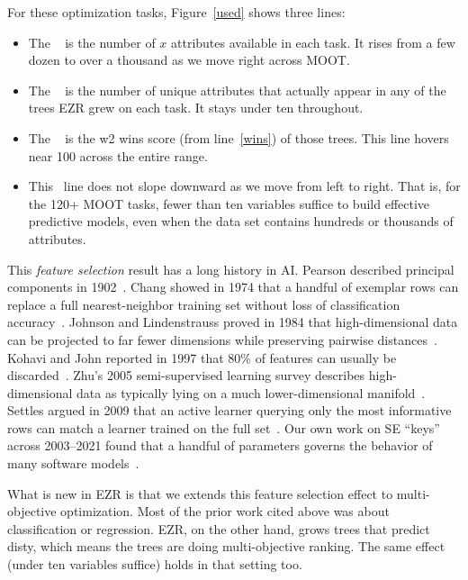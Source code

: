 \documentclass[AMA,STIX2COL]{WileyNJDv5}
\newcommand{\IT}{{\sffamily EZR}}
\begin{document}
For these optimization tasks, Figure~\ref{used} shows three lines:

\begin{itemize}
\item The \color{darkyellow}{\bf yellow line}\color{black}~ is
the number of $x$ attributes available in each task. It rises
from a few dozen to over a thousand as we move right across
MOOT.
\item The \color{red}{\bf red line}\color{black}~ is the number
of unique attributes that actually appear in any of the trees
\IT{} grew on each task. It stays under ten throughout.
\item The \color{blue}{\bf blue line}\color{black}~ is the
\textsf{w2} 
\textsf{wins} score (from line~\ref{wins}) of those trees. 
This line  hovers near 100 across the entire range.
\item
This  \color{blue}{\bf blue line}\color{black}~line does not slope downward as we move from left to right. 
That is, 
for the  120+ MOOT tasks, fewer than ten variables suffice to
build effective predictive models, even when the data set
contains hundreds or thousands of attributes.
\end{itemize}
This {\em feature selection} result
has a long history in AI. Pearson described principal
components in 1902~\cite{pca}. Chang showed in 1974 that a
handful of exemplar rows can replace a full nearest-neighbor
training set without loss of classification
accuracy~\cite{chang74}. Johnson and Lindenstrauss proved in
1984 that high-dimensional data can be projected to far fewer
dimensions while preserving pairwise
distances~\cite{johnson1984extensions}. Kohavi and John reported
in 1997 that 80\% of features can usually be
discarded~\cite{kohavi97}. Zhu's 2005 semi-supervised learning
survey describes high-dimensional data as typically lying on a
much lower-dimensional manifold~\cite{zhu2005semi}. Settles
argued in 2009 that an active learner querying only the most
informative rows can match a learner trained on the full
set~\cite{settles2009active}. Our own work on SE ``keys'' across
2003--2021 found that a handful of parameters governs the
behavior of many software
models~\cite{me03a,me07a,me21a,menzies2008implications}.

What is new in \IT{} is that we extends this feature selection effect
to
multi-objective optimization. Most of the prior work cited above
was about classification or regression. \IT{}, on the other hand, grows trees that
predict \textsf{disty}, which means the trees are doing
multi-objective ranking. The same effect (under ten variables
suffice) holds in that setting too.
\end{document}
